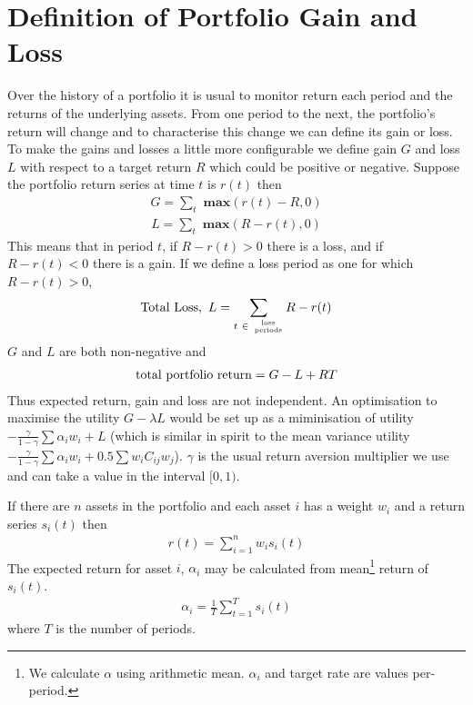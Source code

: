 \documentclass[12pt]{article}
\begin{document}
\section{Definition of Portfolio Gain and Loss}
Over the history of a portfolio it is usual to monitor return each period and the returns of the underlying assets.
From one period to the next, the portfolio's return will change and to characterise this change we can define its gain or loss.
To make the gains and losses a little more configurable we define 
gain $G$ and loss $L$ with respect to a target return $R$ which could be positive or negative.
Suppose the portfolio return series at time $t$ is $r(t)$ then
\begin{eqnarray}
    G = \sum_t {\textbf{ max} }(r(t) - R,0)
\end{eqnarray}
\begin{eqnarray}
    L = \sum_t {\textbf{ max} }(R-r(t),0)
\end{eqnarray}
This means that in period $t$, if $R-r(t) > 0$ there is a loss, and if $R-r(t) < 0$ there is a gain.
If we define a loss period as one for which $R-r(t) > 0$,
\begin{eqnarray}
  {\rm Total\ Loss},\ L= \sum_{t\ \in\ \rm {loss\atop periods}} R-r(t)
\end{eqnarray}
$G$ and $L$ are both non-negative and
\begin{eqnarray}
 {\rm   total\ portfolio\ return}= G - L + RT
\end{eqnarray}
Thus expected return, gain and loss are not independent. An optimisation to maximise the utility $G- \lambda L$
would be set up as a miminisation of utility $-\frac{\gamma}{1-\gamma}\sum\alpha_i w_i + L$ (which is 
similar in spirit to the mean variance utility $-\frac{\gamma}{1-\gamma}\sum\alpha_i w_i + 0.5 \sum w_i C_{ij}w_j$).
$\gamma$ is the usual return aversion multiplier we use and can take a value in the interval $[0,1)$.

If there are $n$ assets in the portfolio and each asset $i$
has a weight $w_i$ and a return series $s_i (t)$ then
\begin{eqnarray}
    r(t) = \sum_{i=1}^{n} w_i s_i(t)
\end{eqnarray}
The expected return for asset $i$, $\alpha_i$ may be calculated from
mean\footnote{We calculate $\alpha$ using arithmetic mean. $\alpha_i$ and target rate are values per-period.} 
return of $s_i(t)$.
\begin{eqnarray}
    \alpha_i =  \frac{1}{T}\sum_{t=1}^{T} s_i(t)
\end{eqnarray}
where $T$ is the number of periods.
\end{document}
